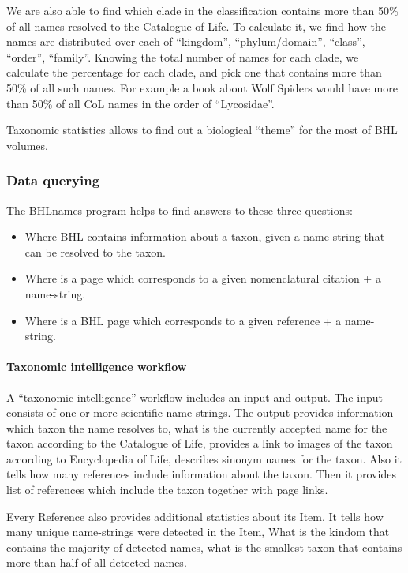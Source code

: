 \documentclass[
]{article}
\providecommand{\tightlist}{%
  \setlength{\itemsep}{0pt}\setlength{\parskip}{0pt}}
\begin{document}
We are also able to find which clade in the classification contains more
than 50\% of all names resolved to the Catalogue of Life. To calculate
it, we find how the names are distributed over each of ``kingdom'',
``phylum/domain'', ``class'', ``order'', ``family''. Knowing the total
number of names for each clade, we calculate the percentage for each
clade, and pick one that contains more than 50\% of all such names. For
example a book about Wolf Spiders would have more than 50\% of all CoL
names in the order of ``Lycosidae''.

Taxonomic statistics allows to find out a biological ``theme'' for the
most of BHL volumes.

\hypertarget{data-querying}{%
\subsubsection{Data querying}\label{data-querying}}

The BHLnames program helps to find answers to these three questions:

\begin{itemize}
\tightlist
\item
  Where BHL contains information about a taxon, given a name string that
  can be resolved to the taxon.
\item
  Where is a page which corresponds to a given nomenclatural citation +
  a name-string.
\item
  Where is a BHL page which corresponds to a given reference + a
  name-string.
\end{itemize}

\hypertarget{taxonomic-intelligence-workflow}{%
\paragraph{Taxonomic intelligence
workflow}\label{taxonomic-intelligence-workflow}}

A ``taxonomic intelligence'' workflow includes an input and output. The
input consists of one or more scientific name-strings. The output
provides information which taxon the name resolves to, what is the
currently accepted name for the taxon according to the Catalogue of
Life, provides a link to images of the taxon according to Encyclopedia
of Life, describes sinonym names for the taxon. Also it tells how many
references include information about the taxon. Then it provides list of
references which include the taxon together with page links.

Every Reference also provides additional statistics about its Item. It
tells how many unique name-strings were detected in the Item, What is
the kindom that contains the majority of detected names, what is the
smallest taxon that contains more than half of all detected names.
\end{document}
